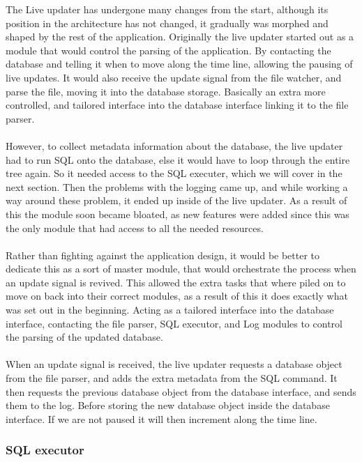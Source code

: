 The Live updater has undergone many changes from the start, although its position in the architecture has not changed, it gradually was morphed and shaped by the rest of the application. Originally the live updater started out as a module that would control the parsing of the application. By contacting the database and telling it when to move along the time line, allowing the pausing of live updates. It would also receive the update signal from the file watcher, and parse the file, moving it into the database storage. Basically an extra more controlled, and tailored interface into the database interface linking it to the file parser.
\\\\
However, to collect metadata information about the database, the live updater had to run SQL onto the database, else it would have to loop through the entire tree again. So it needed access to the SQL executer, which we will cover in the next section. Then the problems with the logging came up, and while working a way around these problem, it ended up inside of the live updater. As a result of this the module soon became bloated, as new features were added since this was the only module that had access to all the needed resources.
\\\\
Rather than fighting against the application design, it would be better to dedicate this as a sort of master module, that would orchestrate the process when an update signal is revived. This allowed the extra tasks that where piled on to move on back into their correct modules, as a result of this it does exactly what was set out in the beginning. Acting as a tailored interface into the database interface, contacting the file parser, SQL executor, and Log modules to control the parsing of the updated database.
\\\\
When an update signal is received, the live updater requests a database object from the file parser, and adds the extra metadata from the SQL command. It then requests the previous database object from the database interface, and sends them to the log. Before storing the new database object inside the database interface. If we are not paused it will then increment along the time line. 

\subsubsection{SQL executor}
\label{subsubsec:sql_executor_imp}

